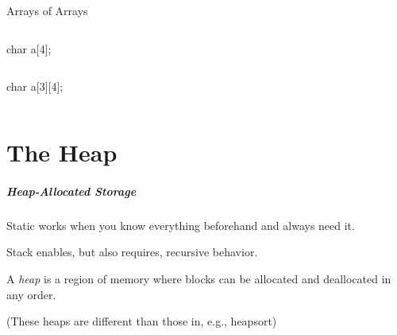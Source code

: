 \documentclass{plt}
\begin{document}
\begin{frame}[fragile]{Arrays of Arrays}
\begin{columns}
  \begin{column}{0.3\textwidth}
\begin{C}
char a[4];
\end{C}
  \end{column}
  \begin{column}{0.7\textwidth}
  \end{column}
\end{columns}

\vspace{3pc}

\begin{columns}
  \begin{column}{0.3\textwidth}
\begin{C}
char a[3][4];
\end{C}
  \end{column}
  \begin{column}{0.7\textwidth}
  \end{column}
\end{columns}
\end{frame}

\part{The Heap}

\begin{frame}
  \frametitle{Heap-Allocated Storage}

Static works when you know everything beforehand and always need it.

Stack enables, but also requires, recursive behavior.

A \emph{heap} is a region of memory where blocks can be allocated and
deallocated in any order.

(These heaps are different than those in, e.g., heapsort)

\end{frame}
\end{document}
